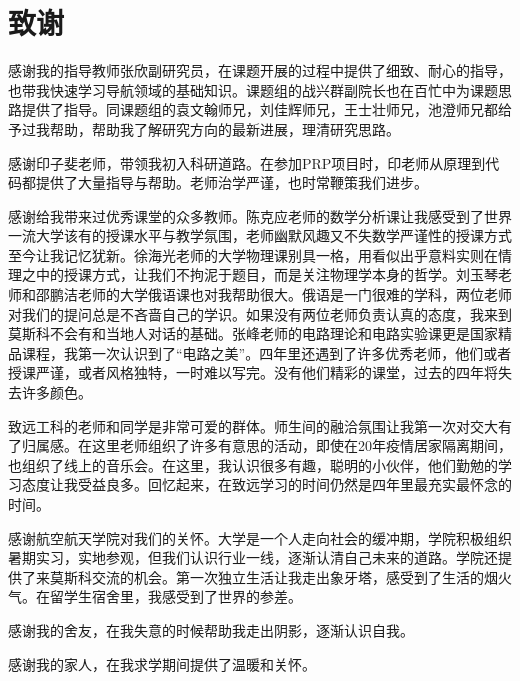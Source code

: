 \newpage
{}

\section*{致\qquad 谢}

感谢我的指导教师张欣副研究员，在课题开展的过程中提供了细致、耐心的指导，也带我快速学习导航领域的基础知识。课题组的战兴群副院长也在百忙中为课题思路提供了指导。同课题组的袁文翰师兄，刘佳辉师兄，王士壮师兄，池澄师兄都给予过我帮助，帮助我了解研究方向的最新进展，理清研究思路。

感谢印子斐老师，带领我初入科研道路。在参加PRP项目时，印老师从原理到代码都提供了大量指导与帮助。老师治学严谨，也时常鞭策我们进步。

感谢给我带来过优秀课堂的众多教师。陈克应老师的数学分析课让我感受到了世界一流大学该有的授课水平与教学氛围，老师幽默风趣又不失数学严谨性的授课方式至今让我记忆犹新。徐海光老师的大学物理课别具一格，用看似出乎意料实则在情理之中的授课方式，让我们不拘泥于题目，而是关注物理学本身的哲学。刘玉琴老师和邵鹏洁老师的大学俄语课也对我帮助很大。俄语是一门很难的学科，两位老师对我们的提问总是不吝啬自己的学识。如果没有两位老师负责认真的态度，我来到莫斯科不会有和当地人对话的基础。张峰老师的电路理论和电路实验课更是国家精品课程，我第一次认识到了“电路之美”。四年里还遇到了许多优秀老师，他们或者授课严谨，或者风格独特，一时难以写完。没有他们精彩的课堂，过去的四年将失去许多颜色。

致远工科的老师和同学是非常可爱的群体。师生间的融洽氛围让我第一次对交大有了归属感。在这里老师组织了许多有意思的活动，即使在20年疫情居家隔离期间，也组织了线上的音乐会。在这里，我认识很多有趣，聪明的小伙伴，他们勤勉的学习态度让我受益良多。回忆起来，在致远学习的时间仍然是四年里最充实最怀念的时间。

感谢航空航天学院对我们的关怀。大学是一个人走向社会的缓冲期，学院积极组织暑期实习，实地参观，但我们认识行业一线，逐渐认清自己未来的道路。学院还提供了来莫斯科交流的机会。第一次独立生活让我走出象牙塔，感受到了生活的烟火气。在留学生宿舍里，我感受到了世界的参差。

感谢我的舍友，在我失意的时候帮助我走出阴影，逐渐认识自我。

感谢我的家人，在我求学期间提供了温暖和关怀。